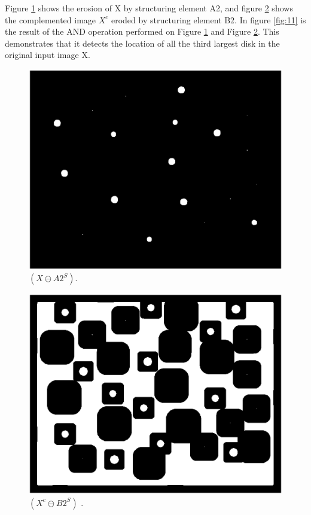 \documentclass[paper=a4, fontsize=11pt]{scrartcl}
\begin{document}
Figure \ref{fig:9} shows the erosion of X by structuring element A2, and figure \ref{fig:10} shows the complemented image $X^c$ eroded by structuring element B2. In figure \ref{fig:11} is the result of the AND operation performed on Figure \ref{fig:9} and Figure \ref{fig:10}. This demonstrates that it detects the location of all the third largest disk in the original input image X.


\begin{figure}
	\centering
	\includegraphics[width=12cm]{MiddleDisk_X_sub_As.eps}
	\caption{ $( X \ominus A2^S)$.}
	\label{fig:9}
\end{figure}

\begin{figure}
	\centering
	\includegraphics[width=12cm]{MiddleDisk_Xc_sub_Bs.eps}
	\caption{ $( X^c \ominus B2^S)$ .}
	\label{fig:10}
\end{figure}
\end{document}
